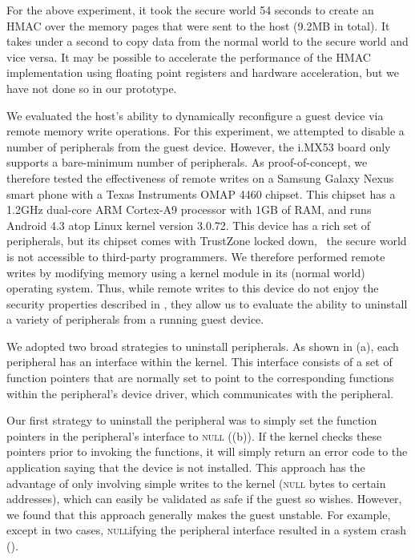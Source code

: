 For the above experiment, it took the secure world 54 seconds to create an HMAC
over the memory pages that were sent to the host (9.2MB in total). It takes
under a second to copy data from the normal world to the secure world and vice
versa. It may be possible to accelerate the performance of the HMAC
implementation using floating point registers and hardware acceleration, but we
have not done so in our prototype.


%
We evaluated the host's ability to dynamically reconfigure a guest device via
remote memory write operations. For this experiment, we attempted to disable a
number of peripherals from the guest device. However, the i.MX53 board only
supports a bare-minimum number of peripherals. As proof-of-concept, we
therefore tested the effectiveness of remote writes on a Samsung Galaxy Nexus
smart phone with a Texas Instruments OMAP 4460 chipset. This chipset has a
1.2GHz dual-core ARM Cortex-A9 processor with 1GB of RAM, and runs Android 4.3
atop Linux kernel version 3.0.72. This device has a rich set of peripherals,
but its chipset comes with TrustZone locked down, \ie~the secure world is not
accessible to third-party programmers.  We therefore performed remote writes by
modifying memory using a kernel module in its (normal world) operating system.
Thus, while remote writes to this device do not enjoy the security properties
described in , they allow us to evaluate the ability
to uninstall a variety of peripherals from a running guest device.

We adopted two broad strategies to uninstall peripherals. As shown in
(a), each peripheral has an interface within the
kernel.  This interface consists of a set of function pointers that are
normally set to point to the corresponding functions within the peripheral's
device driver, which communicates with the peripheral. 

Our first strategy to uninstall the peripheral was to simply set the function
pointers in the peripheral's interface to \textsc{null}
((b)). If the kernel checks these pointers prior to
invoking the functions, it will simply return an error code to the application
saying that the device is not installed. This approach has the advantage of
only involving simple writes to the kernel (\textsc{null} bytes to certain
addresses), which can easily be validated as safe if the guest so wishes.
However, we found that this approach generally makes the guest unstable. For
example, except in two cases, \textsc{null}ifying the peripheral interface
resulted in a system crash ().

